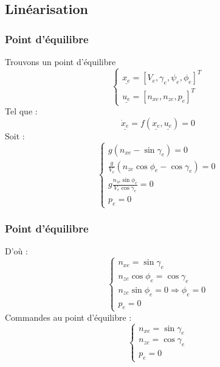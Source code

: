 \documentclass[footheight=2em]{beamer}
\begin{document}
\subsection{Linéarisation}
\begin{frame}
    \frametitle{Point d'équilibre}\pause
    Trouvons un point d'équilibre
    $$
    \left\{
    \begin{array}{l}
        \underline{x_e} = [V_e, \gamma_e, \psi_e, \phi_e]^{T}\\
        \underline{u_e} = [n_{xe}, n_{ze}, p_e]^{T}
    \end{array}
    \right.
    $$
    Tel que :
    $$
    \underline{\dot{x}_e} = f(\underline{x_e}, \underline{u_e}) = 0
    $$\pause
    Soit :
    $$
    \left\{
    \begin{array}{l}
        g(n_{xe} - \sin \gamma_e) = 0\\
        \frac{g}{V_e}(n_{ze} \cos \phi_e - \cos \gamma_e) = 0\\
        g \frac{n_{ze} \sin \phi_e}{V_e \cos \gamma_e} = 0\\
        p_e = 0
    \end{array}
    \right.
    $$
\end{frame}

\begin{frame}
    \frametitle{Point d'équilibre}\pause
    D'où :
    $$
    \left\{
    \begin{array}{l}
        n_{xe} = \sin \gamma_e \\
        n_{ze} \cos \phi_e = \cos \gamma_e \\
        n_{ze} \sin \phi_e = 0 \Longrightarrow \phi_e = 0 \\
        p_e = 0
    \end{array}
    \right.
    $$\pause
    Commandes au point d'équilibre :
    $$\boxed
    {
        \left\{
        \begin{array}{l}
            n_{xe} = \sin \gamma_e \\
            n_{ze} = \cos \gamma_e \\
            p_e = 0
        \end{array}
        \right.
    }
    $$
\end{frame}
\end{document}
